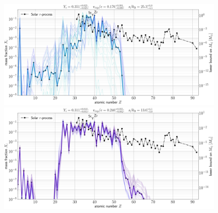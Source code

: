 \documentclass[twocolumn, twocolappendix]{aastex63}
\begin{document}
\begin{figure}[!ht]
    \includegraphics[width=0.98\textwidth]{figs/W18_massfracs_1.40d_Z1-92_Ye_0.351_p0.025_m0.025__vexp_0.176_p0.091_m0.099__s_25.3_p6.0_m4.5__solarL09B14__totalmass1.18e+01M_earth.png}
    \includegraphics[width=0.98\textwidth]{figs/W18_massfracs_1.40d_Z1-92_Ye_0.311_p0.013_m0.011__vexp_0.240_p0.055_m0.082__s_13.6_p4.1_m3.0__solarL09B14__totalmass1.33e+01M_earth.png}

\end{figure}
\end{document}
